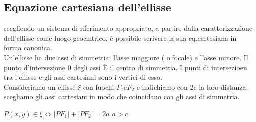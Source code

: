 \documentclass[a4paper,11pt]{article}
\begin{document}
      \subsection{Equazione cartesiana dell'ellisse}
scegliendo un sistema di riferimento appropriato, a partire dalla caratterizzazione dell'ellisse come luogo geoemtrico, è possibile scrivere la sua eq.cartesiana in forma canonica.
\\
Un'ellisse ha due assi di simmetria: l'asse maggiore ( o focale) e l'asse minore. Il punto d'intersezione 0 degli assi È il centro di simmetria. I punti di intersezioen tra l'ellisse e gli assi cartesiani sono i vertici di esso.
\\
Consideriamo un ellisse \( \xi  \) con fuochi \(F_1 e F_2\) e indichiamo con 2c la loro distanza. scegliamo gli assi cartesiani in modo che coincidano con gli assi di simmetria. 


\( P(x,y) \in \xi \Longleftrightarrow \left\lvert PF_1 \right\rvert + \left\lvert PF_2 \right\rvert = 2a \, \, a > c \) 
\end{document}
